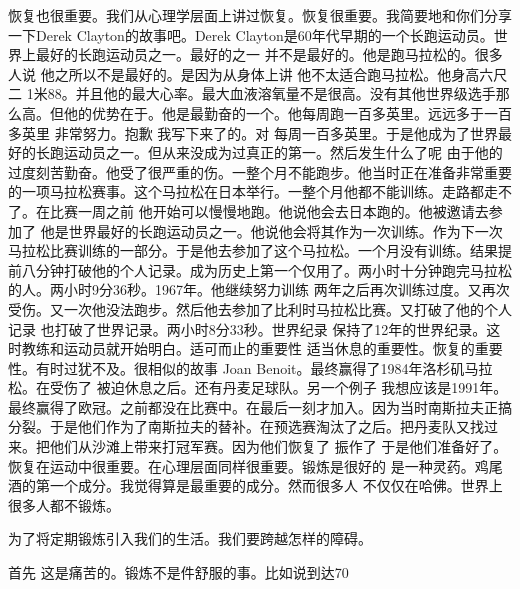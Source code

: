 恢复也很重要。我们从心理学层面上讲过恢复。恢复很重要。我简要地和你们分享一下Derek Clayton的故事吧。Derek Clayton是60年代早期的一个长跑运动员。世界上最好的长跑运动员之一。最好的之一 并不是最好的。他是跑马拉松的。很多人说 他之所以不是最好的。是因为从身体上讲 他不太适合跑马拉松。他身高六尺二 1米88。并且他的最大心率。最大血液溶氧量不是很高。没有其他世界级选手那么高。但他的优势在于。他是最勤奋的一个。他每周跑一百多英里。远远多于一百多英里 非常努力。抱歉 我写下来了的。对 每周一百多英里。于是他成为了世界最好的长跑运动员之一。但从来没成为过真正的第一。然后发生什么了呢 由于他的过度刻苦勤奋。他受了很严重的伤。一整个月不能跑步。他当时正在准备非常重要的一项马拉松赛事。这个马拉松在日本举行。一整个月他都不能训练。走路都走不了。在比赛一周之前 他开始可以慢慢地跑。他说他会去日本跑的。他被邀请去参加了 他是世界最好的长跑运动员之一。他说他会将其作为一次训练。作为下一次马拉松比赛训练的一部分。于是他去参加了这个马拉松。一个月没有训练。结果提前八分钟打破他的个人记录。成为历史上第一个仅用了。两小时十分钟跑完马拉松的人。两小时9分36秒。1967年。他继续努力训练 两年之后再次训练过度。又再次受伤。又一次他没法跑步。然后他去参加了比利时马拉松比赛。又打破了他的个人记录 也打破了世界记录。两小时8分33秒。世界纪录 保持了12年的世界纪录。这时教练和运动员就开始明白。适可而止的重要性 适当休息的重要性。恢复的重要性。有时过犹不及。很相似的故事 Joan Benoit。最终赢得了1984年洛杉矶马拉松。在受伤了 被迫休息之后。还有丹麦足球队。另一个例子 我想应该是1991年。最终赢得了欧冠。之前都没在比赛中。在最后一刻才加入。因为当时南斯拉夫正搞分裂。于是他们作为了南斯拉夫的替补。在预选赛淘汰了之后。把丹麦队又找过来。把他们从沙滩上带来打冠军赛。因为他们恢复了 振作了 于是他们准备好了。恢复在运动中很重要。在心理层面同样很重要。锻炼是很好的 是一种灵药。鸡尾酒的第一个成分。我觉得算是最重要的成分。然而很多人 不仅仅在哈佛。世界上很多人都不锻炼。 

为了将定期锻炼引入我们的生活。我们要跨越怎样的障碍。 

首先 这是痛苦的。锻炼不是件舒服的事。比如说到达70%

